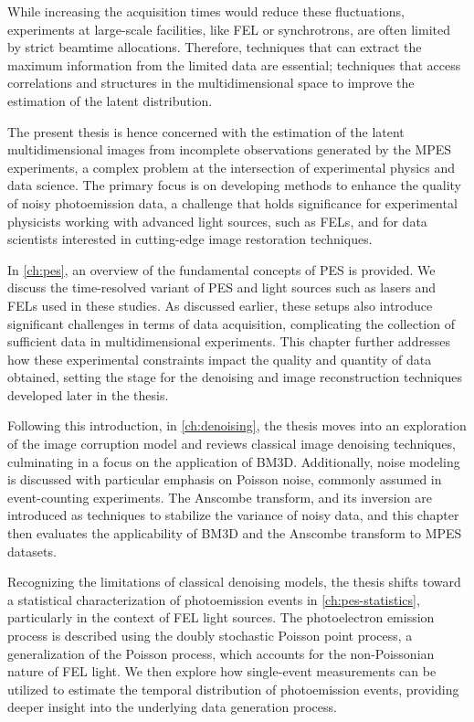 While increasing the acquisition times would reduce these fluctuations, experiments at large-scale facilities, like \gls{FEL} or synchrotrons, are often limited by strict \gls{beamtime} allocations. Therefore, techniques that can extract the maximum information from the limited data are essential; techniques that access correlations and structures in the multidimensional space to improve the estimation of the latent distribution.

The present thesis is hence concerned with the estimation of the latent multidimensional images from incomplete observations generated by the \gls{MPES} experiments, a complex problem at the intersection of experimental physics and data science. The primary focus is on developing methods to enhance the quality of noisy photoemission data, a challenge that holds significance for experimental physicists working with advanced light sources, such as \glspl{FEL}, and for data scientists interested in cutting-edge image restoration techniques.

In \cref{ch:pes}, an overview of the fundamental concepts of \gls{PES} is provided. We discuss the time-resolved variant of \gls{PES} and light sources such as lasers and \glspl{FEL} used in these studies. As discussed earlier, these setups also introduce significant challenges in terms of data acquisition, complicating the collection of sufficient data in multidimensional experiments. This chapter further addresses how these experimental constraints impact the quality and quantity of data obtained, setting the stage for the denoising and image reconstruction techniques developed later in the thesis.

Following this introduction, in \cref{ch:denoising}, the thesis moves into an exploration of the image corruption model and reviews  classical image denoising techniques, culminating in a focus on the application of \gls{BM3D}. Additionally, noise modeling is discussed with particular emphasis on Poisson noise, commonly assumed in event-counting experiments. The Anscombe transform, and its inversion are introduced as techniques to stabilize the variance of noisy data, and this chapter then evaluates the applicability of \gls{BM3D} and the Anscombe transform to \gls{MPES} datasets.

Recognizing the limitations of classical denoising models, the thesis shifts toward a statistical characterization of photoemission events in \cref{ch:pes-statistics}, particularly in the context of \gls{FEL} light sources. The photoelectron emission process is described using the doubly stochastic Poisson point process, a generalization of the Poisson process, which accounts for the non-Poissonian nature of \gls{FEL} light. We then explore how single-event measurements can be utilized to estimate the temporal distribution of photoemission events, providing deeper insight into the underlying data generation process.

